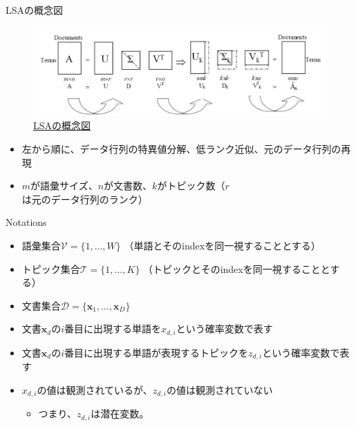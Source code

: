 \documentclass[aspectratio=169,unicode,dvipdfmx,14pt]{beamer}
\begin{document}
\begin{frame}{LSAの概念図}
\FontMath
\vspace{-.2in}
\begin{figure}[htbp]
\begin{center}
\includegraphics[scale=0.47]{svd1.jpg}
\caption{\href{https://liqiangguo.wordpress.com/2011/06/09/latent-semantic-analysis/}{LSAの概念図}}
\label{fig:LSA}
\end{center}
\end{figure}
\begin{itemize}
\item 左から順に、データ行列の特異値分解、低ランク近似、元のデータ行列の再現
\item $m$が語彙サイズ、$n$が文書数、$k$がトピック数（$r$は元のデータ行列のランク）
\end{itemize}
\end{frame}

\begin{frame}{Notations}
\begin{itemize}
\item 語彙集合$\mathcal{V} = \{ 1, \ldots, W \}$ {\footnotesize（単語とそのindexを同一視することとする）}
\item トピック集合$\mathcal{T} = \{ 1, \ldots, K \}$ {\footnotesize（トピックとそのindexを同一視することとする）}
\item 文書集合$\mathcal{D} = \{ \bm{x}_1, \ldots, \bm{x}_D \}$
\item 文書$\bm{x}_d$の$i$番目に出現する単語を$x_{d,i}$という確率変数で表す
\item 文書$\bm{x}_d$の$i$番目に出現する単語が表現するトピックを$z_{d,i}$という確率変数で表す
\item $x_{d,i}$の値は観測されているが、$z_{d,i}$の値は観測されていない
\begin{itemize}
\item つまり、$z_{d,i}$は潜在変数。
\end{itemize}
\end{itemize}
\end{frame}
\end{document}
